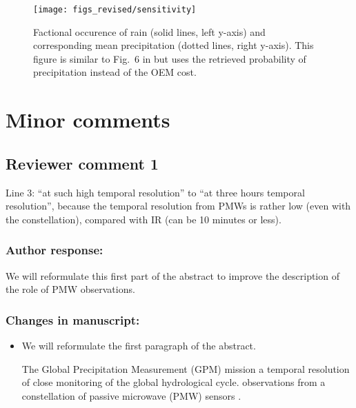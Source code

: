 \begin{figure}[hbpt!]
  \centering \texttt{[image: figs\_revised/sensitivity]}
  \caption{
    Factional occurence of rain (solid lines, left y-axis) and corresponding
    mean precipitation (dotted lines, right y-axis). This figure is similar to
    Fig.~6 in \citet{munchak13} but uses the retrieved probability of precipitation
    instead of the OEM cost.
  }
  \label{fig:sensitivity}
\end{figure}

\section{Minor comments}

\subsection*{Reviewer comment 1}

Line 3: “at such high temporal resolution” to “at three hours temporal
resolution”, because the temporal resolution from PMWs is rather low (even with
the constellation), compared with IR (can be 10 minutes or less).

\subsubsection*{Author response:}

We will reformulate this first part of the abstract to improve the description of the role
of PMW observations.

\subsubsection{Changes in manuscript:}

\begin{itemize}
\item We will reformulate the first paragraph of the abstract.

  \begin{change}[1]
\DIFaddend The Global Precipitation Measurement (GPM) mission \DIFdelbegin {}\DIFdelend \DIFaddbegin {}\DIFaddend a temporal resolution of \DIFdelbegin {}\DIFdelend \DIFaddbegin {}\DIFaddend close monitoring of the global
hydrological cycle. \DIFdelbegin {}\DIFdelend \DIFaddbegin {}\DIFaddend observations from a
\DIFaddbegin {}\DIFaddend constellation of passive microwave (PMW)
sensors \DIFaddbegin {}\DIFaddend .
  \end{change}

\end{itemize}


